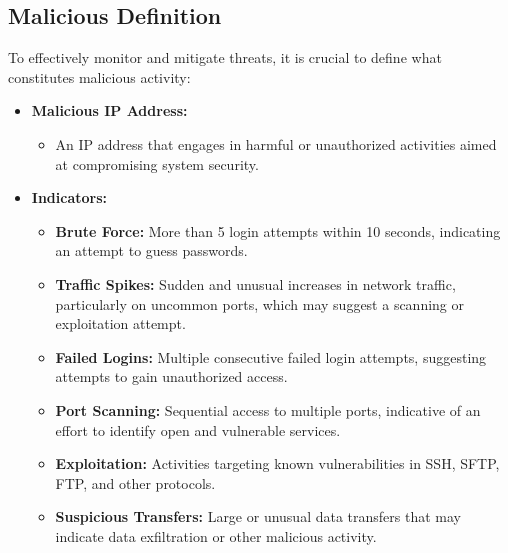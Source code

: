 \documentclass[11pt,a4paper]{article}
\begin{document}
    \subsection{Malicious Definition}\label{subsec:malicious-definition}

    To effectively monitor and mitigate threats, it is crucial to define what constitutes malicious activity:

    \begin{itemize}
        \item \textbf{Malicious IP Address:}
        \begin{itemize}
            \item An IP address that engages in harmful or unauthorized activities aimed at compromising system security.
        \end{itemize}
        \item \textbf{Indicators:}
        \begin{itemize}
            \item \textbf{Brute Force:} More than 5 login attempts within 10 seconds, indicating an attempt to guess passwords.
            \item \textbf{Traffic Spikes:} Sudden and unusual increases in network traffic, particularly on uncommon ports, which may suggest a scanning or exploitation attempt.
            \item \textbf{Failed Logins:} Multiple consecutive failed login attempts, suggesting attempts to gain unauthorized access.
            \item \textbf{Port Scanning:} Sequential access to multiple ports, indicative of an effort to identify open and vulnerable services.
            \item \textbf{Exploitation:} Activities targeting known vulnerabilities in SSH, SFTP, FTP, and other protocols.
            \item \textbf{Suspicious Transfers:} Large or unusual data transfers that may indicate data exfiltration or other malicious activity.
        \end{itemize}
    \end{itemize}
\end{document}
